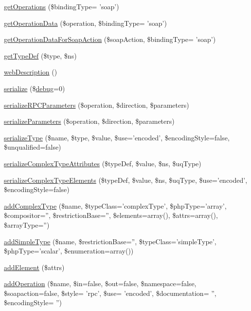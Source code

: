 \begin{DoxyCompactItemize}
\item 
\hyperlink{classwsdl_a1d50941291502c26831b28681dddeb94}{get\-Operations} (\$binding\-Type= 'soap')
\item 
\hyperlink{classwsdl_a38f29f3212405560a4bcf188ad632e1f}{get\-Operation\-Data} (\$operation, \$binding\-Type= 'soap')
\item 
\hyperlink{classwsdl_a5a538dc2c7da9f6f6d6880751318762b}{get\-Operation\-Data\-For\-Soap\-Action} (\$soap\-Action, \$binding\-Type= 'soap')
\item 
\hyperlink{classwsdl_a327b3186f4e3c8b71431ce4a9db77e5a}{get\-Type\-Def} (\$type, \$ns)
\item 
\hyperlink{classwsdl_a43ffc8c82e99905b889fbeb93d4ca6eb}{web\-Description} ()
\item 
\hyperlink{classwsdl_a25fcce1ac19624739857406748ba332a}{serialize} (\$\hyperlink{classnusoap__base_ac652bd9010bd39b0f2854f7ded3f6f33}{debug}=0)
\item 
\hyperlink{classwsdl_aba212dea327156517e32e7a3cd67d88a}{serialize\-R\-P\-C\-Parameters} (\$operation, \$direction, \$parameters)
\item 
\hyperlink{classwsdl_afed507a7c4d2b216e27515ca9181361c}{serialize\-Parameters} (\$operation, \$direction, \$parameters)
\item 
\hyperlink{classwsdl_a06a97e7bc4c0fe43b1193177d3266c30}{serialize\-Type} (\$name, \$type, \$value, \$use='encoded', \$encoding\-Style=false, \$unqualified=false)
\item 
\hyperlink{classwsdl_a1bebf04c625f86d2c65c6a2fc4c69f52}{serialize\-Complex\-Type\-Attributes} (\$type\-Def, \$value, \$ns, \$uq\-Type)
\item 
\hyperlink{classwsdl_a9abd63b860271a2010c4d35b5c607b45}{serialize\-Complex\-Type\-Elements} (\$type\-Def, \$value, \$ns, \$uq\-Type, \$use='encoded', \$encoding\-Style=false)
\item 
\hyperlink{classwsdl_a8086789ccd44f879ab77ba98dfa08aa2}{add\-Complex\-Type} (\$name, \$type\-Class='complex\-Type', \$php\-Type='array', \$compositor='', \$restriction\-Base='', \$elements=array(), \$attrs=array(), \$array\-Type='')
\item 
\hyperlink{classwsdl_a31228a55d8cdb602e32f481406e7455c}{add\-Simple\-Type} (\$name, \$restriction\-Base='', \$type\-Class='simple\-Type', \$php\-Type='scalar', \$enumeration=array())
\item 
\hyperlink{classwsdl_a7341d393047f63fdcb50dd44d2eff448}{add\-Element} (\$attrs)
\item 
\hyperlink{classwsdl_a629076bad717a1ef68261afe210001fc}{add\-Operation} (\$name, \$in=false, \$out=false, \$namespace=false, \$soapaction=false, \$style= 'rpc', \$use= 'encoded', \$documentation= '', \$encoding\-Style= '')
\end{DoxyCompactItemize}
